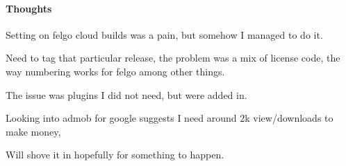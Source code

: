 

\paragraph{Thoughts}

Setting on felgo cloud builds was a pain, but somehow I managed to do it.

Need to tag that particular release, the problem was a mix of license code, the way numbering works for felgo among other things.

The issue was plugins I did not need, but were added in.

Looking into admob for google suggests I need around 2k view/downloads to make money,

Will shove it in hopefully for something to happen.
